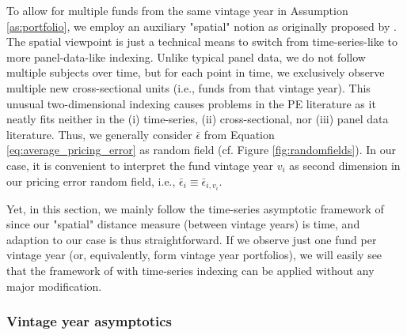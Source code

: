 \documentclass[12pt]{article}
\begin{document}
To allow for multiple funds from the same vintage year in Assumption \ref{as:portfolio}, we employ an auxiliary "spatial" notion as originally proposed by \cite{KN16}.
The spatial viewpoint is just a technical means to switch from time-series-like to more panel-data-like indexing.
Unlike typical panel data, we do not follow multiple subjects over time, but for each point in time, we exclusively observe multiple new cross-sectional units (i.e., funds from that vintage year).
This unusual two-dimensional indexing causes problems in the PE literature as it neatly fits neither in the (i) time-series, (ii) cross-sectional, nor (iii) panel data literature.
Thus, we generally consider $\bar{\epsilon}$ from Equation \ref{eq:average_pricing_error} as random field (cf. Figure  \ref{fig:randomfields}).
In our case, it is convenient to interpret the fund vintage year $v_i$ as second dimension in our pricing error random field, i.e., $\bar{\epsilon}_{i} \equiv \bar{\epsilon}_{i, v_i}$.

Yet, in this section, we mainly follow the time-series asymptotic framework of \cite{PP97} since our "spatial" distance measure (between vintage years) is time, and adaption to our case is thus straightforward.
If we observe just one fund per vintage year (or, equivalently, form vintage year portfolios), we will easily see that the framework of \cite{PP97} with time-series indexing can be applied without any major modification.


\subsubsection{Vintage year asymptotics}
\end{document}
